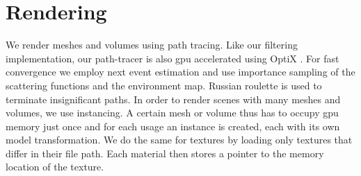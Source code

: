 \section{Rendering}
\label{sec:rendering}
We render meshes and volumes using path tracing.
Like our filtering implementation, our path-tracer is also \ac{gpu} accelerated using OptiX \cite{parker_optix}.
For fast convergence we employ next event estimation and use importance sampling of the scattering functions and the environment map.
Russian roulette is used to terminate insignificant paths.
In order to render scenes with many meshes and volumes, we use instancing.
A certain mesh or volume thus has to occupy \ac{gpu} memory just once and for each usage an instance is created, each with its own model transformation.
We do the same for textures by loading only textures that differ in their file path.
Each material then stores a pointer to the memory location of the texture.


